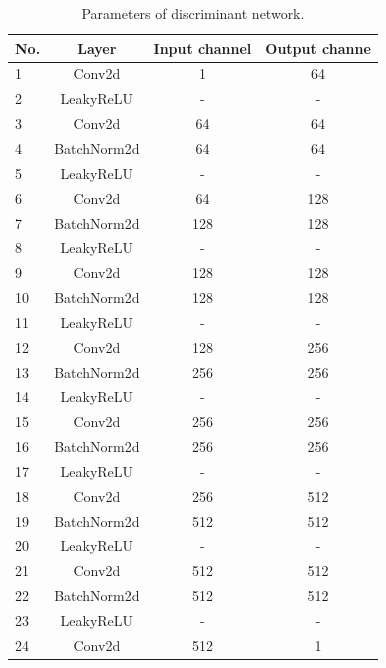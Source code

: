 \documentclass[10pt,twocolumn,letterpaper]{article}
\begin{document}
\begin{table}
\begin{center}
	\begin{tabular}{lccc}
		\hline		
		No.&Layer      &Input channel&Output channe\\
		\hline
		1  &Conv2d     &1        &64    \\
		2  &LeakyReLU  &-        &-       \\
		3  &Conv2d     &64       &64     	\\
		4  &BatchNorm2d&64       &64    \\
		5  &LeakyReLU  &-        &-        \\
		6  &Conv2d     &64       &128       \\
		7  &BatchNorm2d&128      &128      \\
		8  &LeakyReLU  &-        &-        \\
		9  &Conv2d     &128      &128     \\
		10 &BatchNorm2d&128      &128      \\
		11 &LeakyReLU  &-        &-      \\
		12 &Conv2d     &128      &256     \\
		13 &BatchNorm2d&256      &256 \\
		14 &LeakyReLU  &-        &-      \\
		15 &Conv2d     &256      &256     \\
		16 &BatchNorm2d&256      &256     \\
		17 &LeakyReLU  &-        &-       \\
		18 &Conv2d     &256      &512     \\
		19 &BatchNorm2d&512      &512     \\
		20 &LeakyReLU  &-        &-       \\
		21 &Conv2d     &512      &512     \\
		22 &BatchNorm2d&512      &512     \\
		23 &LeakyReLU  &-        &-       \\
		24 &Conv2d     &512      &1       \\
		\hline
	\end{tabular}
\end{center}
\caption{Parameters of discriminant network.}
\label{tab1}
\end{table}
\end{document}
